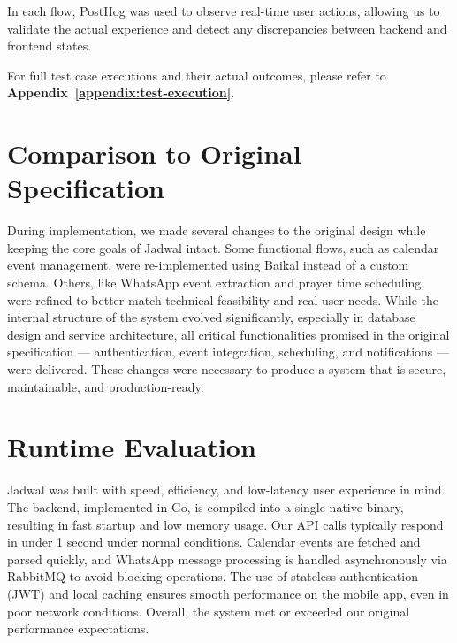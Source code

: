 In each flow, PostHog was used to observe real-time user actions, allowing us to validate the actual experience and detect any discrepancies between backend and frontend states.

For full test case executions and their actual outcomes, please refer to \textbf{Appendix~\ref{appendix:test-execution}}.

\section{Comparison to Original Specification}

During implementation, we made several changes to the original design while keeping the core goals of Jadwal intact. Some functional flows, such as calendar event management, were re-implemented using Baikal instead of a custom schema. Others, like WhatsApp event extraction and prayer time scheduling, were refined to better match technical feasibility and real user needs. While the internal structure of the system evolved significantly, especially in database design and service architecture, all critical functionalities promised in the original specification — authentication, event integration, scheduling, and notifications — were delivered. These changes were necessary to produce a system that is secure, maintainable, and production-ready.

\section{Runtime Evaluation}

Jadwal was built with speed, efficiency, and low-latency user experience in mind. The backend, implemented in Go, is compiled into a single native binary, resulting in fast startup and low memory usage. Our API calls typically respond in under 1 second under normal conditions. Calendar events are fetched and parsed quickly, and WhatsApp message processing is handled asynchronously via RabbitMQ to avoid blocking operations. The use of stateless authentication (JWT) and local caching ensures smooth performance on the mobile app, even in poor network conditions. Overall, the system met or exceeded our original performance expectations.
